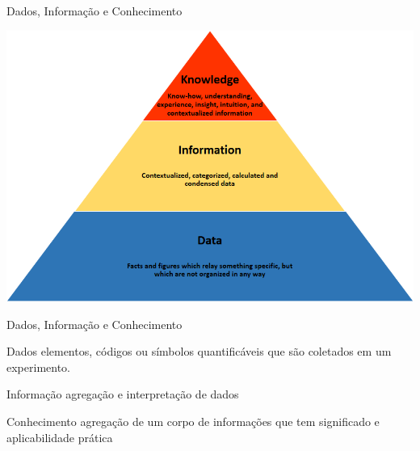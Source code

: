 \documentclass{beamer}
\begin{document}
\begin{frame}{Dados, Informação e Conhecimento}
  \begin{center}
    \includegraphics[height=0.9\textheight]{Intro/Knowledge_pyramid}
  \end{center}
\end{frame}

\begin{frame}{Dados, Informação e Conhecimento}
    \begin{block}{Dados}
      elementos, códigos ou símbolos quantificáveis que são
    coletados em um experimento.
    \end{block}
    \begin{block}{Informação}
      agregação e interpretação de dados
    \end{block}
    \begin{block}{Conhecimento}
      agregação de um corpo de informações que tem significado e
      aplicabilidade prática
    \end{block}
\end{frame}


\end{document}
